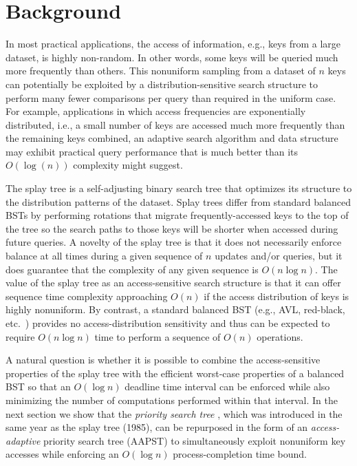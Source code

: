 \documentclass{article}
\begin{document}
\section{Background}

In most practical applications, the access of information, e.g., keys from a large dataset, is highly non-random. In other words, some keys will be queried much more frequently than others. This nonuniform sampling from a dataset of $n$ keys can potentially be exploited by a distribution-sensitive search structure to perform many fewer comparisons per query than required in the uniform case. For example, applications in which access frequencies are exponentially distributed, i.e., a small number of keys are accessed much more frequently than the remaining keys combined, an adaptive search algorithm and data structure may exhibit practical query performance that is much better than its $O(\log(n))$ complexity might suggest.

The splay tree \cite{splay} is a self-adjusting \cite{selfadj} binary search tree that optimizes its structure to the distribution patterns of the dataset. Splay trees differ from standard balanced BSTs by performing rotations that migrate frequently-accessed keys to the top of the tree so the search paths to those keys will be shorter when accessed during future queries. A novelty of the splay tree is that it does not necessarily enforce balance at all times during a given sequence of $n$ updates and/or queries, but it does guarantee that the complexity of any given sequence is $O(n\log n)$. The value of the splay tree as an access-sensitive search structure is that it can offer sequence time complexity approaching $O(n)$ if the access distribution of keys is highly nonuniform. By contrast, a standard balanced BST (e.g., AVL, red-black, etc.\ \cite{bst}) provides no access-distribution sensitivity and thus can be expected to require $O(n \log n)$ time to perform a sequence of $O(n)$ operations. 

A natural question is whether it is possible to combine the access-sensitive properties of the splay tree with the efficient worst-case properties of a balanced BST so that an $O(\log n)$ deadline time interval can be enforced while also minimizing the number of computations performed within that interval. In the next section we show that the {\em priority search tree} \cite{pst}, which was introduced in the same year as the splay tree (1985), can be repurposed in the form of an {\em access-adaptive} priority search tree (AAPST) to simultaneously exploit nonuniform key accesses while enforcing an $O(\log n)$ process-completion time bound.
\end{document}
